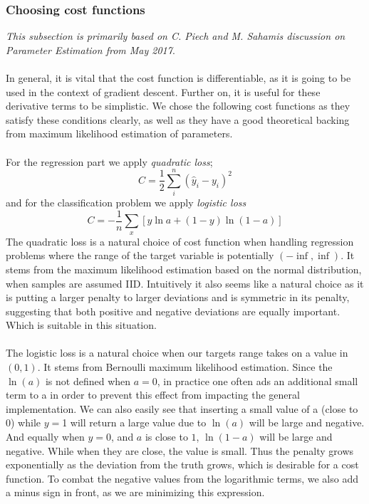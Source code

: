 \documentclass[10pt, a4paper, twocolumn]{article}
\begin{document}
		\subsubsection{Choosing cost functions}
			\textit{This subsection is primarily based on C. Piech and M. Sahamis discussion on Parameter Estimation from May 2017\cite{Stanford11}}.\\\\
			In general, it is vital that the cost function is differentiable, as it is going to be used in the context of gradient descent. Further on, it is useful for these derivative terms to be simplistic. We chose the following cost functions as they satisfy these conditions clearly, as well as they have a good theoretical backing from maximum likelihood estimation of parameters.\\\\
			For the regression part we apply \emph{quadratic loss}; 
				$$C = \frac{1}{2}\sum_i^n\left(\hat{y}_i-y_i\right)^2$$
			and for the classification problem we apply \emph{logistic loss}
				$$C = -\frac{1}{n} \sum_x \left[y \ln a + (1-y ) \ln (1-a) \right]$$
			The quadratic loss is a natural choice of cost function when handling regression problems where the range of the target variable is potentially $(-\inf, \inf)$. It stems from the maximum likelihood estimation based on the normal distribution, when samples are assumed IID. Intuitively it also seems like a natural choice as it is putting a larger penalty to larger deviations and is symmetric in its penalty, suggesting that both positive and negative deviations are equally important. Which is suitable in this situation.\\\\ 
			The logistic loss is a natural choice when our targets range takes on a value in $(0,1)$. It stems from Bernoulli maximum likelihood estimation. Since the $\ln(a)$ is not defined when $a = 0$, in practice one often ads an additional small term to a in order to prevent this effect from impacting the general implementation. We can also easily see that inserting a small value of a (close to $0$) while $y = $1 will return a large value due to $\ln(a)$ will be large and negative. And equally when $y = 0$, and $a$ is close to $1$, $\ln(1-a)$ will be large and negative. While when they are close, the value is small. Thus the penalty grows exponentially as the deviation from the truth grows, which is desirable for a cost function. To combat the negative values from the logarithmic terms, we also add a minus sign in front, as we are minimizing this expression. 						
				
\end{document}
